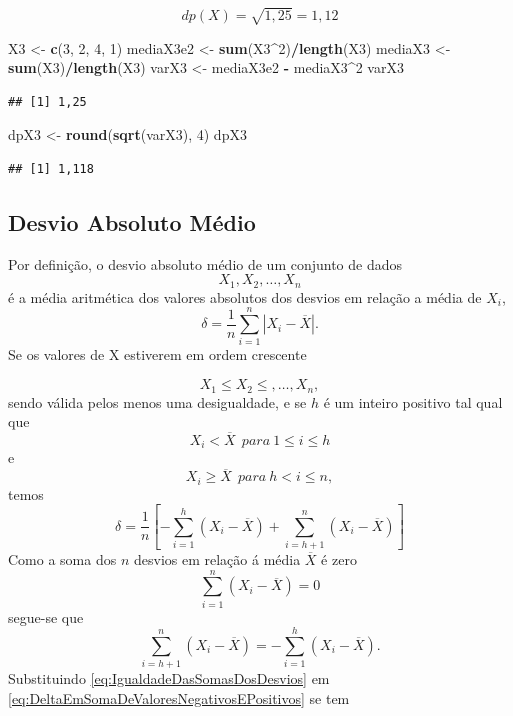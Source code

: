 \documentclass[
]{book}
\newenvironment{Shaded}{\begin{snugshade}}{\end{snugshade}}
\newcommand{\DecValTok}[1]{\textcolor[rgb]{0.00,0.00,0.81}{#1}}
\newcommand{\KeywordTok}[1]{\textcolor[rgb]{0.13,0.29,0.53}{\textbf{#1}}}
\newcommand{\NormalTok}[1]{#1}
\newcommand{\OperatorTok}[1]{\textcolor[rgb]{0.81,0.36,0.00}{\textbf{#1}}}
\newcommand{\StringTok}[1]{\textcolor[rgb]{0.31,0.60,0.02}{#1}}
\begin{document}
\begin{equation*}
  dp(X) = \sqrt{1,25} = 1,12
\end{equation*}

\begin{Shaded}
\begin{Highlighting}[]
\NormalTok{X3 <-}\StringTok{ }\KeywordTok{c}\NormalTok{(}\DecValTok{3}\NormalTok{, }\DecValTok{2}\NormalTok{, }\DecValTok{4}\NormalTok{, }\DecValTok{1}\NormalTok{)}
\NormalTok{mediaX3e2 <-}\StringTok{ }\KeywordTok{sum}\NormalTok{(X3}\OperatorTok{^}\DecValTok{2}\NormalTok{)}\OperatorTok{/}\KeywordTok{length}\NormalTok{(X3)}
\NormalTok{mediaX3 <-}\StringTok{ }\KeywordTok{sum}\NormalTok{(X3)}\OperatorTok{/}\KeywordTok{length}\NormalTok{(X3)}
\NormalTok{varX3 <-}\StringTok{ }\NormalTok{mediaX3e2 }\OperatorTok{-}\StringTok{ }\NormalTok{mediaX3}\OperatorTok{^}\DecValTok{2}
\NormalTok{varX3}
\end{Highlighting}
\end{Shaded}

\begin{verbatim}
## [1] 1,25
\end{verbatim}

\begin{Shaded}
\begin{Highlighting}[]
\NormalTok{dpX3 <-}\StringTok{ }\KeywordTok{round}\NormalTok{(}\KeywordTok{sqrt}\NormalTok{(varX3), }\DecValTok{4}\NormalTok{)}
\NormalTok{dpX3}
\end{Highlighting}
\end{Shaded}

\begin{verbatim}
## [1] 1,118
\end{verbatim}

\hypertarget{desvio-absoluto-muxe9dio}{%
\subsection{Desvio Absoluto Médio}\label{desvio-absoluto-muxe9dio}}

Por definição, o desvio absoluto médio de um conjunto de dados
\[
  X_1, X_2, \ldots, X_n
\]
é a média aritmética dos valores absolutos dos desvios em relação a média de \(X_i\),
\[
  \delta = \dfrac{1}{n} \sum_{i=1}^{n} \left| X_i - \overline{X} \right|.
  \label{eq:DesvioAbsolutoMedio}
\]
Se os valores de X estiverem em ordem crescente

\[
  X_1\leq X_2 \leq , \ldots, X_n,  
\]
sendo válida pelos menos uma desigualdade, e se \(h\) é um inteiro positivo tal qual que
\[
  X_i < \overline{X}~~para~1 \leq i \leq h
\]
e
\[
  X_i \geq \overline{X}~~para~h < i \leq n, 
\]
temos
\[
  \delta = \dfrac{1}{n}\left[ - \sum_{i=1}^{h}\left( X_i - \overline{X} \right) + \sum_{i=h+1}^{n} \left( X_i - \overline{X} \right) \right] 
\label{eq:DeltaEmSomaDeValoresNegativosEPositivos}
\]
Como a soma dos \(n\) desvios em relação á média \(\overline{X}\) é zero
\[
  \sum_{i=1}^{n} \left(X_i - \overline{X} \right) = 0
\]
segue-se que
\[
  \sum_{i=h+1}^{n} \left( X_i - \overline{X} \right) = - \sum_{i=1}^{h}\left( X_i - \overline{X} \right).
  \label{eq:IgualdadeDasSomasDosDesvios}
\]
Substituindo \eqref{eq:IgualdadeDasSomasDosDesvios} em \eqref{eq:DeltaEmSomaDeValoresNegativosEPositivos} se tem
\end{document}
